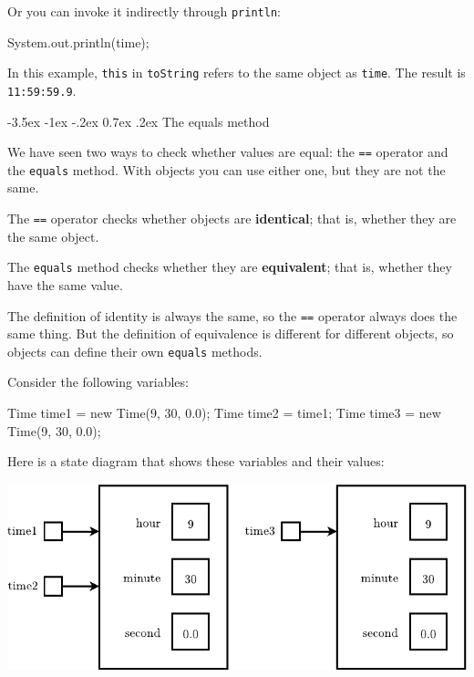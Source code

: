\documentclass[12pt]{book}
\makeatletter
\theoremstyle{exercise}
\newcommand{\java}[1]{\verb"#1"}
\renewcommand{\section}{\@startsection{section}{1}{\z@}%
    {-3.5ex \@plus -1ex \@minus -.2ex}%
    {0.7ex \@plus.2ex}%
    {\normalfont\Large\bfseries}}
\newcommand{\java}[1]{\lstinline{#1}} %
\makeatother
\begin{document}
Or you can invoke it indirectly through \java{println}:

\begin{code}
    System.out.println(time);
\end{code}

In this example, \java{this} in \java{toString} refers to the same object as \java{time}.  The result is \java{11:59:59.9}.


\section{The equals method}
\label{equals}

We have seen two ways to check whether values are equal: the \java{==} operator and the \java{equals} method.
With objects you can use either one, but they are not the same.


The \java{==} operator checks whether objects are {\bf identical}; that is, whether they are the same object.


The \java{equals} method checks whether they are {\bf equivalent}; that is, whether they have the same value.

The definition of identity is always the same, so the \java{==} operator always does the same thing.
But the definition of equivalence is different for different objects, so objects can define their own \java{equals} methods.

Consider the following variables:

\begin{code}
    Time time1 = new Time(9, 30, 0.0);
    Time time2 = time1;
    Time time3 = new Time(9, 30, 0.0);
\end{code}

Here is a state diagram that shows these variables and their values:


\begin{center}
\includegraphics{figs/time2.pdf}
\end{center}
\end{document}
